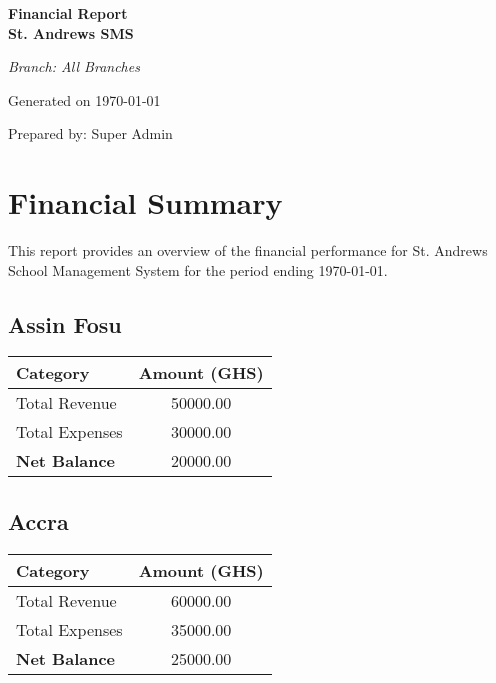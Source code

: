 \documentclass[a4paper,12pt]{article}
\begin{document}
\begin{titlepage}
    \centering
    \vspace*{2cm}
    {\color{twilight}\huge\bfseries Financial Report \\ St. Andrews SMS \par}
    \vspace{1cm}
    {\Large\itshape Branch: All Branches \par}
    \vspace{0.5cm}
    {\large Generated on \today \par}
    \vspace{2cm}
    {\large Prepared by: Super Admin \par}
\end{titlepage}

\section*{Financial Summary}
This report provides an overview of the financial performance for St. Andrews School Management System for the period ending \today.

\subsection*{Assin Fosu}
\begin{tabular}{l S[table-format=6.2]}
    \toprule
    \textbf{Category} & \textbf{Amount (GHS)} \\
    \midrule
    Total Revenue & 50000.00 \\
    Total Expenses & 30000.00 \\
    \midrule
    \textbf{Net Balance} & 20000.00 \\
    \bottomrule
\end{tabular}

\subsection*{Accra}
\begin{tabular}{l S[table-format=6.2]}
    \toprule
    \textbf{Category} & \textbf{Amount (GHS)} \\
    \midrule
    Total Revenue & 60000.00 \\
    Total Expenses & 35000.00 \\
    \midrule
    \textbf{Net Balance} & 25000.00 \\
    \bottomrule
\end{tabular}
\end{document}
